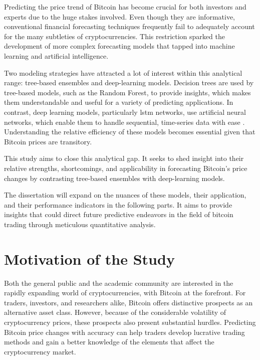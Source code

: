 \smallskip

Predicting the price trend of Bitcoin has become crucial for both investors and experts due to the huge stakes involved. Even though they are informative, conventional financial forecasting techniques frequently fail to adequately account for the many subtleties of cryptocurrencies. This restriction sparked the development of more complex forecasting models that tapped into machine learning and artificial intelligence.

\smallskip

Two modeling strategies have attracted a lot of interest within this analytical range: tree-based ensembles and deep-learning models. Decision trees are used by tree-based models, such as the Random Forest, to provide insights, which makes them understandable and useful for a variety of predicting applications. In contrast, deep learning models, particularly  \gls{lstm} networks, use artificial neural networks, which enable them to handle sequential, time-series data with ease \citep{Hochreiter1997LongSM}. Understanding the relative efficiency of these models becomes essential given that Bitcoin prices are transitory.

\smallskip

This study aims to close this analytical gap. It seeks to shed insight into their relative strengths, shortcomings, and applicability in forecasting Bitcoin's price changes by contrasting tree-based ensembles with deep-learning models.

The dissertation will expand on the nuances of these models, their application, and their performance indicators in the following parts. It aims to provide insights that could direct future predictive endeavors in the field of bitcoin trading through meticulous quantitative analysis.

\section{Motivation of the Study}

Both the general public and the academic community are interested in the rapidly expanding world of cryptocurrencies, with Bitcoin at the forefront. For traders, investors, and researchers alike, Bitcoin offers distinctive prospects as an alternative asset class. However, because of the considerable volatility of cryptocurrency prices, these prospects also present substantial hurdles. Predicting Bitcoin price changes with accuracy can help traders develop lucrative trading methods and gain a better knowledge of the elements that affect the cryptocurrency market.

